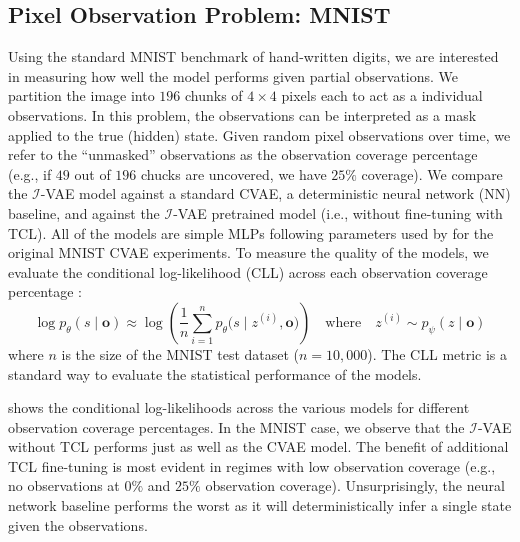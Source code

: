 \subsection{Pixel Observation Problem: MNIST}\label{sec:mnist_experiments}
Using the standard MNIST benchmark of hand-written digits, we are interested in measuring how well the model performs given partial observations.
We partition the image into $196$ chunks of $4 \times 4$ pixels each to act as a individual observations.
In this problem, the observations can be interpreted as a mask applied to the true (hidden) state.
Given random pixel observations over time, we refer to the ``unmasked'' observations as the observation coverage percentage (e.g., if $49$ out of $196$ chucks are uncovered, we have $25\%$ coverage).
We compare the $\mathcal{I}$-VAE model against a standard CVAE, a deterministic neural network (NN) baseline, and against the $\mathcal{I}$-VAE pretrained model (i.e., without fine-tuning with TCL).
All of the models are simple MLPs following parameters used by \textcite{sohn2015learning} for the original MNIST CVAE experiments.
To measure the quality of the models, we evaluate the conditional log-likelihood (CLL) across each observation coverage percentage \cite{sohn2015learning}:
\begin{equation}
    \log p_\theta(s \mid \mathbf{o}) \approx \log \left( \frac{1}{n} \sum_{i=1}^n p_\theta\big(s \mid z^{(i)}, \mathbf{o}\big) \right) \quad \text{where} \quad z^{(i)} \sim p_\psi(z \mid \mathbf{o}) \label{eq:cll}
\end{equation}
where $n$ is the size of the MNIST test dataset ($n = 10{,}000$).
The CLL metric is a standard way to evaluate the statistical performance of the models.


 shows the conditional log-likelihoods across the various models for different observation coverage percentages.
In the MNIST case, we observe that the $\mathcal{I}$-VAE without TCL performs just as well as the CVAE model.
The benefit of additional TCL fine-tuning is most evident in regimes with low observation coverage (e.g., no observations at $0\%$ and $25\%$ observation coverage).
Unsurprisingly, the neural network baseline performs the worst as it will deterministically infer a single state given the observations.


